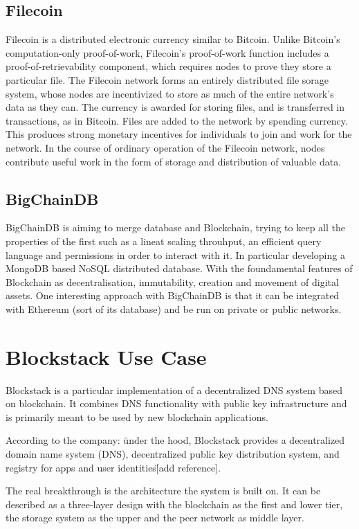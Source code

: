 \subsection*{Filecoin}
Filecoin is a distributed electronic currency similar to Bitcoin. Unlike Bitcoin’s computation-only proof-of-work, Filecoin’s proof-of-work function includes a proof-of-retrievability component, which requires nodes to prove they store a particular file. The Filecoin network forms an entirely distributed file sorage system, whose nodes are incentivized to store as much of the entire network’s data as they can. The currency is awarded for storing files, and is transferred in transactions, as in Bitcoin. Files are added to the network by spending currency. This produces strong monetary incentives for individuals to join and work for the network. In the course of ordinary operation of the Filecoin network, nodes contribute useful work in the form of storage and distribution of valuable data.

\subsection*{BigChainDB}

BigChainDB is aiming to merge database and Blockchain, trying to keep all the properties of the first such as a lineat scaling throuhput, an efficient query language and permissions in order to interact with it. In particular developing a MongoDB based NoSQL distributed database.
With the foundamental features of Blockchain as decentralisation, immutability, creation and movement of digital assets.
One interesting approach with BigChainDB is that it can be integrated with Ethereum (sort of its database) and be run on private or public networks.

\section{Blockstack Use Case}
Blockstack is a particular implementation of a decentralized DNS system based on blockchain. It combines DNS functionality with public key infrastructure and is primarily meant to be used by new blockchain applications.

According to the company: \"under the hood, Blockstack provides a decentralized domain name system (DNS), decentralized public key distribution system, and registry for apps and user identities\" [add reference].

The real breakthrough is the architecture the system is built on. It can be described as a three-layer design with the blockchain as the first and lower tier, the storage system as the upper and the peer network as middle layer.

